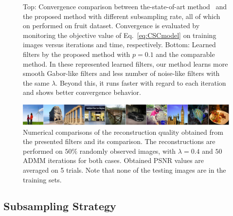 \begin{figure}[h]
\begin{subfigure}{0.23\textwidth}
\end{subfigure}
\caption{Top: Convergence comparison between the-state-of-art method~\cite{heide2015fast} and the proposed method with different subsampling rate, all of which on performed on fruit dataset. Convergence is evaluated by monitoring the objective value of Eq.~\ref{eq:CSCmodel} on training images versus iterations and time, respectively. Bottom: Learned filters by the proposed method with $p=0.1$ and the comparable method. In these represented learned filters, our method learns more smooth Gabor-like filters and less number of noise-like filters with the same $\lambda$. Beyond this, it runs faster with regard to each iteration and shows better convergence behavior.}
\label{fig:subsampleResult}
\end{figure}

\begin{figure}[h]
    \centering
    \includegraphics[width=1\textwidth]{figure/reconImage.pdf}
    \caption{Numerical comparisons of the reconstruction quality obtained from the presented filters and its comparison. The reconstructions are performed on $50\%$ randomly observed images, with $\lambda = 0.4$ and $50$ ADMM iterations for both cases. Obtained PSNR values are averaged on 5 trials. Note that none of the testing images are in the training sets.} \label{fig:PSNRrecon}
\end{figure}

\subsection{Subsampling Strategy}

